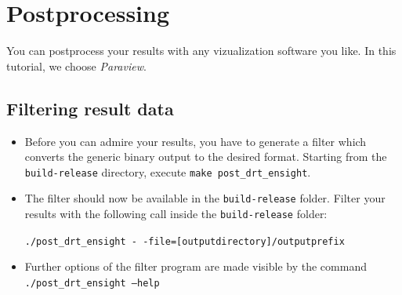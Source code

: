 \section{Postprocessing}

You can postprocess your results with any vizualization software you like. In this tutorial, we choose \emph{Paraview}.

\subsection{Filtering result data}
\begin{itemize}
\item Before you can admire your results, you have to generate a filter
which converts the generic binary \baci{} output to the desired format.
Starting from the \texttt{build-release} directory, execute \texttt{make post\_drt\_ensight}.
\item The filter should now be available in the \texttt{build-release} folder. Filter your results with the following call inside the \texttt{build-release} folder:
\begin{center}
\texttt{./post\_drt\_ensight -\,-file=[outputdirectory]/outputprefix}
\end{center}
\item Further options of the filter program are made visible by the command \texttt{./post\_drt\_ensight --help}
\end{itemize}

